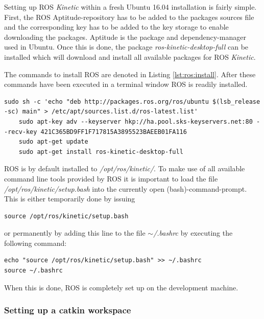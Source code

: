 Setting up ROS \textit{Kinetic} within a fresh Ubuntu 16.04 installation is fairly simple. First, the ROS Aptitude-repository has to be added to the packages sources file and the corresponding key has to be added to the key storage to enable downloading the packages. Aptitude is the package and dependency-manager used in Ubuntu. Once this is done, the package \textit{ros-kinetic-desktop-full} can be installed which will download and install all available packages for ROS \textit{Kinetic}.

The commands to install ROS are denoted in Listing \ref{lst:ros:install}. After these commands have been executed in a terminal window ROS is readily installed.

\begin{minipage}{\linewidth}
	\begin{lstlisting}[caption={Commands for installing ROS\cite{ros:install}},label={lst:ros:install}]
	sudo sh -c 'echo "deb http://packages.ros.org/ros/ubuntu $(lsb_release -sc) main" > /etc/apt/sources.list.d/ros-latest.list'
	sudo apt-key adv --keyserver hkp://ha.pool.sks-keyservers.net:80 --recv-key 421C365BD9FF1F717815A3895523BAEEB01FA116
	sudo apt-get update
	sudo apt-get install ros-kinetic-desktop-full
	\end{lstlisting}
\end{minipage}

ROS is by default installed to \textit{/opt/ros/kinetic/}. To make use of all available command line tools provided by ROS it is important to load the file \textit{/opt/ros/kinetic/setup.bash} into the currently open (bash)-command-prompt. This is either temporarily done by issuing

\begin{lstlisting}[caption={Temporarily loading the ROS environment into bash}]
source /opt/ros/kinetic/setup.bash
\end{lstlisting}

or permanently by adding this line to the file \textit{$\sim$/.bashrc} by executing the following command:

\begin{lstlisting}[caption={Permamently installing the ROS environment into bash}]
echo "source /opt/ros/kinetic/setup.bash" >> ~/.bashrc
source ~/.bashrc
\end{lstlisting}

When this is done, ROS is completely set up on the development machine.

\subsubsection[Setting up catkin]{Setting up a catkin workspace} 

